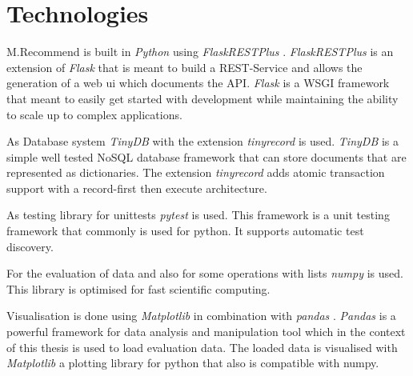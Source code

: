 \section{Technologies}
\label{sec:DesignImplementation:Technologies}

M.Recommend is built in \emph{Python} \cite{PythonOrg} using \emph{FlaskRESTPlus} \cite{FlaskRESTPlus13Documentation}. \emph{FlaskRESTPlus} is an extension of \emph{Flask} \cite{FlaskDocumentation} that is meant to build a REST-Service and allows the generation of a web ui which documents the API. \emph{Flask} is a WSGI \cite{WhatWSGI} framework that meant to easily get started with development while maintaining the ability to scale up to complex applications.

As Database system \emph{TinyDB} \cite{TinyDB15Documentation} with the extension \emph{tinyrecord} \cite{junEugeneeeoTinyrecord2020} is used. \emph{TinyDB} is a simple well tested NoSQL database framework that can store documents that are represented as dictionaries. The extension \emph{tinyrecord} adds atomic transaction support with a record-first then execute architecture.

As testing library for unittests \emph{pytest} \cite{PytestDocumentation} is used. This framework is a unit testing framework that commonly is used for python. It supports automatic test discovery.

For the evaluation of data and also for some operations with lists \emph{numpy} \cite{NumPy} is used. This library is optimised for fast scientific computing. 

Visualisation is done using \emph{Matplotlib} \cite{MatplotlibDocumentation} in combination with \emph{pandas} \cite{PandasPythonData}. \emph{Pandas} is a powerful framework for data analysis and manipulation tool which in the context of this thesis is used to load evaluation data. The loaded data is visualised with \emph{Matplotlib} a plotting library for python that also is compatible with numpy.